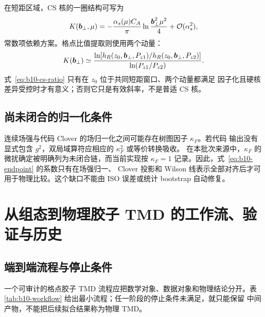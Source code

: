 在短距区域，CS 核的一圈结构可写为
\begin{equation}
  K(\boldsymbol b_\perp,\mu)
  =-\frac{\alpha_s(\mu)C_A}{\pi}
  \ln\frac{\boldsymbol b_\perp^2\mu^2}{4}+\mathcal O(\alpha_s^2),
  \label{eq:b10-cs-one-loop}
\end{equation}
常数项依赖方案。格点比值提取则使用两个动量：
\begin{equation}
  K(\boldsymbol b_\perp)\simeq
  \frac{\ln\!\left[h_R(z_0,\boldsymbol b_\perp,P_{z1})/
  h_R(z_0,\boldsymbol b_\perp,P_{z2})\right]}{\ln(P_{z1}/P_{z2})}.
  \label{eq:b10-cs-ratio}
\end{equation}
式~\eqref{eq:b10-cs-ratio} 只有在 $z_0$ 位于共同短距窗口、两个动量都满足
因子化且硬核差异受控时才有意义；否则它只是有效斜率，不是普适 CS 核。

\section{尚未闭合的归一化条件}

连续场强与代码 Clover 的场归一化之间可能存在树图因子 $\kappa_F$。若代码
输出没有显式包含 $g^2$，双局域算符应相应的 $\kappa_F^2$ 或等价转换吸收。
在本批次来源中，$\kappa_F$ 的微扰确定被明确列为未闭合链，而当前实现按
$\kappa_F=1$ 记录。因此，式~\eqref{eq:b10-endpoint} 的系数只有在场强归一、
Clover 投影和 Wilson 线表示全部对齐后才可用于物理比较。这个缺口不能由
ISO 误差或统计 bootstrap 自动修复。

\chapter{从组态到物理胶子 TMD 的工作流、验证与历史}

\section{端到端流程与停止条件}

一个可审计的格点胶子 TMD 流程应把数学对象、数据对象和物理结论分开。表
\ref{tab:b10-workflow} 给出最小流程；任一阶段的停止条件未满足，就只能保留
中间产物，不能把后续拟合结果称为物理 TMD。

